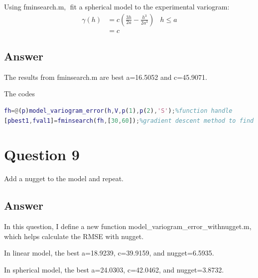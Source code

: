 \documentclass[
	12pt, %
]{fphw}
\begin{document}
\begin{problem}
Using fminsearch.m, fit a spherical model to the experimental variogram:
\begin{equation}
	\begin{array}{rlr}
	\gamma(h) & =c\left(\frac{3 h}{2 a}-\frac{h^{3}}{2 a^{3}}\right) & h \leq a \\
	& =c
	\end{array}
\end{equation}
\end{problem}


\subsection*{Answer}


The results from fminsearch.m are best a=16.5052 and c=45.9071.

The codes

\begin{lstlisting}[language=Matlab,escapeinside=``]
fh=@(p)model_variogram_error(h,V,p(1),p(2),'S');%function handle
[pbest1,fval1]=fminsearch(fh,[30,60]);%gradient descent method to find best parameters

\end{lstlisting}




\section*{Question 9 }

\begin{problem}
Add a nugget to the model and repeat.
	
\end{problem}

\subsection*{Answer}
In this question, I define a new function model\_variogram\_error\_withnugget.m, which helps calculate the RMSE with nugget.

In linear model, the best a=18.9239, c=39.9159, and nugget=6.5935.

In spherical model, the best a=24.0303, c=42.0462, and nugget=3.8732.
\end{document}
